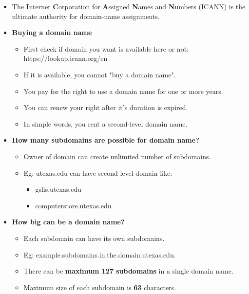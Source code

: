 
\begin{flushleft}

	\begin{itemize}
		\item The \textbf{I}nternet \textbf{C}orporation for \textbf{A}ssigned \textbf{N}ames and \textbf{N}umbers (ICANN) is the ultimate authority for domain-name assignments. 
		\bigskip
		\bigskip
		\item \textbf{Buying a domain name}
		\begin{itemize}
			\item First check if domain you want is available here or not: https://lookup.icann.org/en
			\item If it is available, you cannot "buy a domain name".
			\item You pay for the right to use a domain name for one or more years.
			\item You can renew your right after it's duration is expired.
			\item In simple words, you rent a second-level domain name.
		\end{itemize}
		\bigskip
		\bigskip
		 \item \textbf{How many subdomains are possible for domain name?}
		 \begin{itemize}
		 	\item Owner of domain can create unlimited number of subdomains.
		 	 \item Eg: utexas.edu can have second-level domain like:
		 	\begin{itemize}
		 		\item gslis.utexas.edu
		 		\item computerstore.utexas.edu
		 	\end{itemize}
		 \end{itemize}
		\bigskip
		\bigskip
		 \item \textbf{How big can be a domain name?}
		 \begin{itemize}
		 	\item Each subdomain can have its own subdomains. 
		 	\item Eg: example.subdomains.in.the.domain.utexas.edu.
			\item There can be \textbf{maximum 127 subdomains} in a single domain name. 
			\item Maximum size of each subdomain is \textbf{63} characters.
		 \end{itemize}  
		
		

		
	\end{itemize}








\end{flushleft}
\newpage
